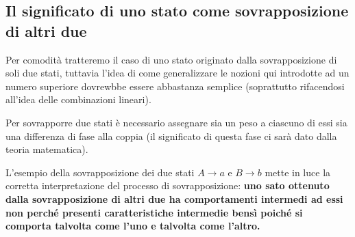 \documentclass[../../../../Meccanica_quantistica]{subfiles}
\begin{document}
\subsection{
    Il significato di uno stato come sovrapposizione di altri due
  }
    \label{
      subsec:Il-significato-di-uno-stato-come-sovrapposizione-di-altri-due
    }
    Per comodità tratteremo il caso di uno stato originato dalla
    sovrapposizione di soli due stati, tuttavia l'idea di come
    generalizzare le nozioni qui introdotte ad un numero superiore
    dovrewbbe essere abbastanza semplice (soprattutto rifacendosi
    all'idea delle combinazioni lineari).

    Per sovrapporre due stati è necessario assegnare sia un peso a
    ciascuno di essi sia una differenza di fase alla coppia (il
    significato di questa fase ci sarà dato dalla teoria
    matematica). 
    
    L'esempio della sovrapposizione dei due stati $A \rightarrow a$
    e $B \rightarrow b$ mette in luce la corretta interpretazione
    del processo di sovrapposizione: \textbf{uno sato ottenuto dalla
    sovrapposizione di altri due ha comportamenti intermedi ad essi
    non perché presenti caratteristiche intermedie bensì poiché si
    comporta talvolta come l'uno e talvolta come l'altro.}
\end{document}
